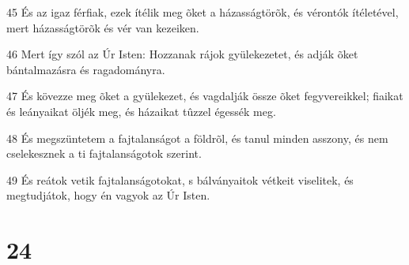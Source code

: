 \par 45 És az igaz férfiak, ezek ítélik meg õket a házasságtörõk, és vérontók ítéletével, mert házasságtörõk és  vér van kezeiken.
\par 46 Mert így szól az Úr Isten: Hozzanak rájok gyülekezetet, és adják õket bántalmazásra és ragadományra.
\par 47 És kövezze meg õket a gyülekezet, és vagdalják össze õket fegyvereikkel; fiaikat és leányaikat öljék meg, és házaikat tûzzel égessék meg.
\par 48 És megszüntetem a fajtalanságot a földrõl, és tanul minden asszony, és nem cselekesznek a ti fajtalanságotok szerint.
\par 49 És reátok vetik fajtalanságotokat, s bálványaitok vétkeit viselitek, és megtudjátok, hogy én vagyok az Úr Isten.

\chapter{24}

